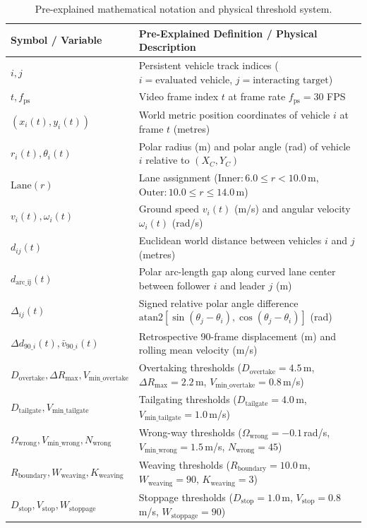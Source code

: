 \begin{table}[H]
\centering
\small
\caption{Pre-explained mathematical notation and physical threshold system.}
\label{tab:notation}
\begin{tabularx}{\textwidth}{l X}
\toprule
\textbf{Symbol / Variable} & \textbf{Pre-Explained Definition / Physical Description} \\
\midrule
$i, j$ & Persistent vehicle track indices ($i = \text{evaluated vehicle}$, $j = \text{interacting target}$) \\
$t, f_{\text{ps}}$ & Video frame index $t$ at frame rate $f_{\text{ps}} = 30$ FPS \\
$(x_i(t), y_i(t))$ & World metric position coordinates of vehicle $i$ at frame $t$ (metres) \\
$r_i(t), \theta_i(t)$ & Polar radius (m) and polar angle (rad) of vehicle $i$ relative to $(X_C, Y_C)$ \\
$\mathrm{Lane}(r)$ & Lane assignment ($\text{Inner}: 6.0 \le r < 10.0$\,m, $\text{Outer}: 10.0 \le r \le 14.0$\,m) \\
$v_i(t), \omega_i(t)$ & Ground speed $v_i(t)$ (m/s) and angular velocity $\omega_i(t)$ (rad/s) \\
$d_{ij}(t)$ & Euclidean world distance between vehicles $i$ and $j$ (metres) \\
$d_{\text{arc\_ij}}(t)$ & Polar arc-length gap along curved lane center between follower $i$ and leader $j$ (m) \\
$\Delta_{ij}(t)$ & Signed relative polar angle difference $\mathrm{atan2}[\sin(\theta_j-\theta_i), \cos(\theta_j-\theta_i)]$ (rad) \\
$\Delta d_{90\_i}(t), \bar{v}_{90\_i}(t)$ & Retrospective 90-frame displacement (m) and rolling mean velocity (m/s) \\
\midrule
$D_{\text{overtake}}, \Delta R_{\text{max}}, V_{\text{min\_overtake}}$ & Overtaking thresholds ($D_{\text{overtake}} = 4.5$\,m, $\Delta R_{\text{max}} = 2.2$\,m, $V_{\text{min\_overtake}} = 0.8$\,m/s) \\
$D_{\text{tailgate}}, V_{\text{min\_tailgate}}$ & Tailgating thresholds ($D_{\text{tailgate}} = 4.0$\,m, $V_{\text{min\_tailgate}} = 1.0$\,m/s) \\
$\Omega_{\text{wrong}}, V_{\text{min\_wrong}}, N_{\text{wrong}}$ & Wrong-way thresholds ($\Omega_{\text{wrong}} = -0.1$\,rad/s, $V_{\text{min\_wrong}} = 1.5$\,m/s, $N_{\text{wrong}} = 45$) \\
$R_{\text{boundary}}, W_{\text{weaving}}, K_{\text{weaving}}$ & Weaving thresholds ($R_{\text{boundary}} = 10.0$\,m, $W_{\text{weaving}} = 90$, $K_{\text{weaving}} = 3$) \\
$D_{\text{stop}}, V_{\text{stop}}, W_{\text{stoppage}}$ & Stoppage thresholds ($D_{\text{stop}} = 1.0$\,m, $V_{\text{stop}} = 0.8$\,m/s, $W_{\text{stoppage}} = 90$) \\
\bottomrule
\end{tabularx}
\end{table}

